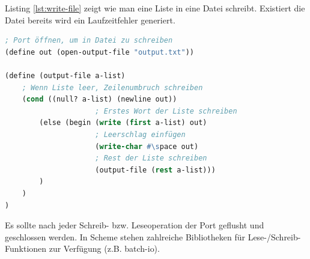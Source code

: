 Listing \ref{lst:write-file} zeigt wie man eine Liste in eine Datei schreibt. Existiert die Datei bereits wird ein Laufzeitfehler generiert.

\begin{lstlisting}[language=Lisp, caption=Datei schreiben, label=lst:write-file]
; Port öffnen, um in Datei zu schreiben
(define out (open-output-file "output.txt"))

(define (output-file a-list)
	; Wenn Liste leer, Zeilenumbruch schreiben
	(cond ((null? a-list) (newline out))
					 ; Erstes Wort der Liste schreiben
		(else (begin (write (first a-list) out)
					 ; Leerschlag einfügen
					 (write-char #\space out)
					 ; Rest der Liste schreiben
					 (output-file (rest a-list)))
		)
	)
)
\end{lstlisting}

Es sollte nach jeder Schreib- bzw. Leseoperation der Port geflusht und geschlossen werden. In Scheme stehen zahlreiche Bibliotheken für Lese-/Schreib-Funktionen zur Verfügung (z.B. batch-io).